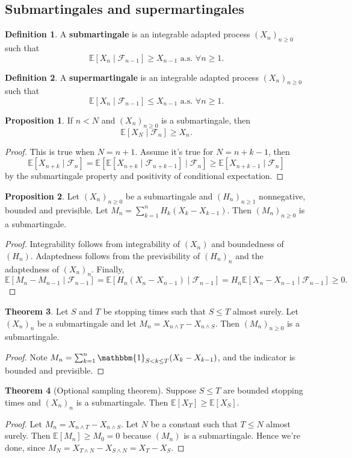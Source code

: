 \documentclass{article}
\theoremstyle{definition}
\newtheorem{theorem}{Theorem}[section]
\newtheorem{prop}[theorem]{Proposition}
\newtheorem{defn}{Definition}[section]
\begin{document}
\subsection{Submartingales and supermartingales}
\begin{defn}
    A \textbf{submartingale} is an integrable adapted process $(X_n)_{n\ge 0}$ such that \[
    \mathbb{E}[X_n \mid \mathcal{F}_{n-1}] \ge X_{n-1} \text{ a.s. }\forall n\ge 1.
    \]
\end{defn}
\begin{defn}
    A \textbf{supermartingale} is an integrable adapted process $(X_n)_{n\ge 0}$ such that \[
        \mathbb{E}[X_n \mid \mathcal{F}_{n-1}] \le X_{n-1} \text{ a.s. }\forall n\ge 1.
    \]
\end{defn}
\begin{prop}
    If $n<N$ and $(X_n)_{n\ge 0}$ is a submartingale, then $$\mathbb{E}[X_N \mid \mathcal{F}_n] \ge X_n.$$
\end{prop}
\begin{proof}
    This is true when $N=n+1$. Assume it's true for $N=n+k-1$, then \[
    \mathbb{E}[X_{n+k} \mid \mathcal{F}_n] = \mathbb{E}[\mathbb{E}[X_{n+k} \mid \mathcal{F}_{n+k-1}] \mid \mathcal{F}_n] \ge \mathbb{E}[X_{n+k-1} \mid \mathcal{F}_n]
    \]
    by the submartingale property and positivity of conditional expectation.
\end{proof}
\begin{prop}
    Let $(X_n)_{n\ge 0}$ be a submartingale and $(H_n)_{n\ge 1}$ nonnegative, bounded and previsible. Let $M_n = \sum_{k=1}^{n} H_k(X_k-X_{k-1})$.
    Then $(M_n)_{n\ge 0}$ is a submartingale.
\end{prop}
\begin{proof}
    Integrability follows from integrability of $(X_n)$ and boundedness of $(H_n)$. Adaptedness follows from the previsibility of $(H_n)_n$ and the adaptedness of $(X_n)_n$. Finally, \[
    \mathbb{E}[M_n-M_{n-1} \mid \mathcal{F}_{n-1}] = \mathbb{E}[H_n(X_n-X_{n-1}) \mid \mathcal{F}_{n-1}] = H_n \mathbb{E}[X_n-X_{n-1} \mid \mathcal{F}_{n-1}] \ge 0.
    \]
\end{proof}
\begin{theorem}
    Let $S$ and $T$ be stopping times such that $S\le T$ almost surely. Let $(X_n)_n$ be a submartingale and let $M_n = X_{n \wedge T} - X_{n \wedge S}$. Then $(M_n)_{n\ge 0}$ is a submartingale. 
\end{theorem}
\begin{proof}
    Note $M_n = \sum_{k=1}^{n} \mathbbm{1}_{S<k\le T}(X_k-X_{k-1})$, and the indicator is bounded and previsible.
\end{proof}
\begin{theorem}[Optional sampling theorem]
    Suppose $S \le T$ are bounded stopping times and $(X_n)_{n}$ is a submartingale. Then $\mathbb{E}[X_T]\ge \mathbb{E}[X_S]$.
\end{theorem}
\begin{proof}
    Let $M_n = X_{n \wedge T} - X_{n \wedge S}$. Let $N$ be a constant such that $T\le N$ almost surely. Then $\mathbb{E}[M_n]\ge M_0=0$ because $(M_n)$ is a submartingale. Hence we're done, since $M_N = X_{T \wedge N} - X_{S \wedge N} = X_T-X_S$.
\end{proof}
\end{document}
